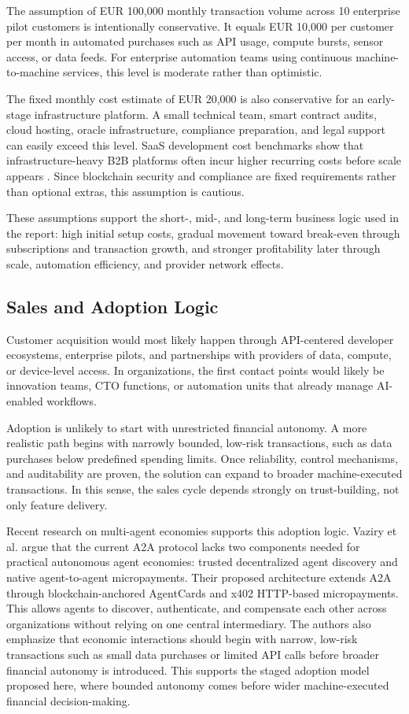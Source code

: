 \documentclass[12pt,a4paper,oneside]{article}
\theoremstyle{definition}
\theoremstyle{plain}
\begin{document}
The assumption of EUR 100,000 monthly transaction volume across 10 enterprise pilot customers is intentionally conservative. It equals EUR 10,000 per customer per month in automated purchases such as API usage, compute bursts, sensor access, or data feeds. For enterprise automation teams using continuous machine-to-machine services, this level is moderate rather than optimistic.

The fixed monthly cost estimate of EUR 20,000 is also conservative for an early-stage infrastructure platform. A small technical team, smart contract audits, cloud hosting, oracle infrastructure, compliance preparation, and legal support can easily exceed this level. SaaS development cost benchmarks show that infrastructure-heavy B2B platforms often incur higher recurring costs before scale appears \citep{tenet2026}. Since blockchain security and compliance are fixed requirements rather than optional extras, this assumption is cautious.

These assumptions support the short-, mid-, and long-term business logic used in the report: high initial setup costs, gradual movement toward break-even through subscriptions and transaction growth, and stronger profitability later through scale, automation efficiency, and provider network effects.

\subsection{Sales and Adoption Logic}

Customer acquisition would most likely happen through API-centered developer ecosystems, enterprise pilots, and partnerships with providers of data, compute, or device-level access. In organizations, the first contact points would likely be innovation teams, CTO functions, or automation units that already manage AI-enabled workflows.

Adoption is unlikely to start with unrestricted financial autonomy. A more realistic path begins with narrowly bounded, low-risk transactions, such as data purchases below predefined spending limits. Once reliability, control mechanisms, and auditability are proven, the solution can expand to broader machine-executed transactions. In this sense, the sales cycle depends strongly on trust-building, not only feature delivery.

Recent research on multi-agent economies supports this adoption logic. Vaziry et al. \citep{vaziry2025multiagent} argue that the current A2A protocol lacks two components needed for practical autonomous agent economies: trusted decentralized agent discovery and native agent-to-agent micropayments. Their proposed architecture extends A2A through blockchain-anchored AgentCards and x402 HTTP-based micropayments. This allows agents to discover, authenticate, and compensate each other across organizations without relying on one central intermediary. The authors also emphasize that economic interactions should begin with narrow, low-risk transactions such as small data purchases or limited API calls before broader financial autonomy is introduced. This supports the staged adoption model proposed here, where bounded autonomy comes before wider machine-executed financial decision-making.
\end{document}
